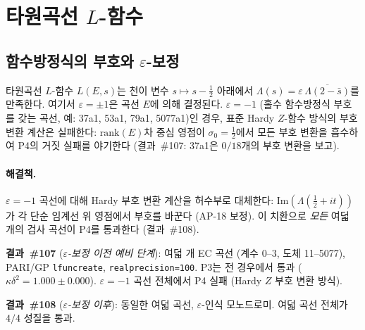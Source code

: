 \documentclass[11pt, a4paper]{article}
\theoremstyle{plain}
\theoremstyle{definition}
\begin{document}
\section{타원곡선 $L$-함수}
\label{sec:ec}

\subsection{함수방정식의 부호와 $\varepsilon$-보정}
\label{ssec:epsilon}

타원곡선 $L$-함수 $L(E,s)$는 천이 변수 $s\mapsto s-\tfrac{1}{2}$ 아래에서
$\Lambda(s) = \varepsilon\,\overline{\Lambda(2-\bar{s})}$를 만족한다.
여기서 $\varepsilon=\pm 1$은 곡선 $E$에 의해 결정된다.
$\varepsilon=-1$ (홀수 함수방정식 부호를 갖는 곡선,
예: 37a1, 53a1, 79a1, 5077a1)인 경우,
표준 Hardy $Z$-함수 방식의 부호 변환 계산은 실패한다:
$\text{rank}(E)$차 중심 영점이
$\sigma_{0}=\tfrac{1}{2}$에서 모든 부호 변환을 흡수하여
P4의 거짓 실패를 야기한다
(결과~\#107: 37a1은 $0/18$개의 부호 변환을 보고).

\paragraph{해결책.}
$\varepsilon=-1$ 곡선에 대해 Hardy 부호 변환 계산을
허수부로 대체한다: $\mathrm{Im}(\Lambda(\tfrac{1}{2}+it))$가
각 단순 임계선 위 영점에서 부호를 바꾼다 (AP-18 보정).
이 치환으로 \textit{모든} 여덟 개의 검사 곡선이 P4를 통과한다
(결과~\#108).

\medskip
\noindent
\textbf{결과~\#107} (\textit{$\varepsilon$-보정 이전 예비 단계}):
여덟 개 EC 곡선 (계수 0--3, 도체 11--5077),
PARI/GP \texttt{lfuncreate}, \texttt{realprecision=100}.
P3는 전 경우에서 통과 ($\kappa\delta^{2}=1.000\pm0.000$).
$\varepsilon=-1$ 곡선 전체에서 P4 실패 (Hardy $Z$ 부호 변환 방식).

\medskip
\noindent
\textbf{결과~\#108} (\textit{$\varepsilon$-보정 이후}):
동일한 여덟 곡선, $\varepsilon$-인식 모노드로미.
여덟 곡선 전체가 $4/4$ 성질을 통과.
\end{document}
